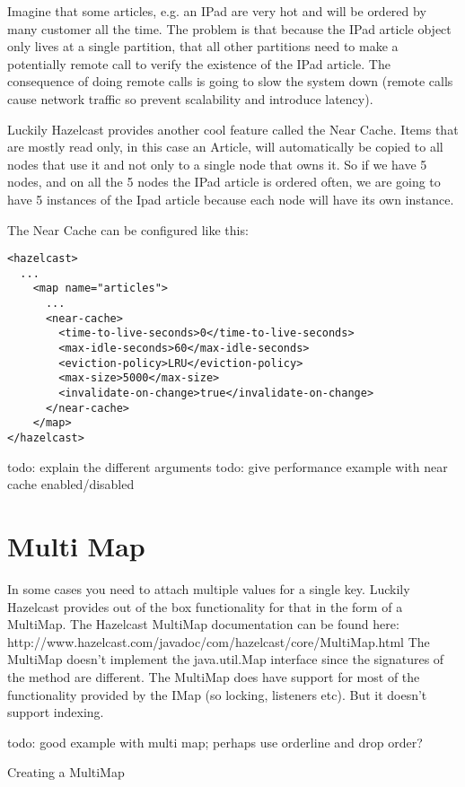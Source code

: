 Imagine that some articles, e.g. an IPad are very hot and will be ordered by many customer all the time. The problem is that because the IPad article object only lives at a single partition, that all other partitions need to make a potentially remote call to verify the existence of the IPad article. The consequence of doing remote calls is going to slow the system down (remote calls cause network traffic so prevent scalability and introduce latency).

Luckily Hazelcast provides another cool feature called the Near Cache. Items that are mostly read only, in this case an Article, will automatically be copied to all nodes that use it and not only to a single node that owns it. So if we have 5 nodes, and on all the 5 nodes the IPad article is ordered often, we are going to have 5 instances of the Ipad article because each node will have its own instance.

The Near Cache can be configured like this:
\begin{verbatim}
<hazelcast>
  ...
    <map name="articles">
      ...
      <near-cache>
        <time-to-live-seconds>0</time-to-live-seconds>
        <max-idle-seconds>60</max-idle-seconds>
        <eviction-policy>LRU</eviction-policy>
        <max-size>5000</max-size>
        <invalidate-on-change>true</invalidate-on-change>
      </near-cache>
    </map>
</hazelcast>
\end{verbatim}

todo: explain the different arguments
todo: give performance example with near cache enabled/disabled

\section{Multi Map}

In some cases you need to attach multiple values for a single key. Luckily Hazelcast provides out of the box functionality for that in the form of a MultiMap. The Hazelcast MultiMap documentation can be found here: http://www.hazelcast.com/javadoc/com/hazelcast/core/MultiMap.html
The MultiMap doesn't implement the java.util.Map interface since the signatures of the method are different. The MultiMap does have support for most of the functionality provided by the IMap (so locking, listeners etc). But it doesn't support indexing.

todo: good example with multi map; perhaps use orderline and drop order?

Creating a MultiMap

